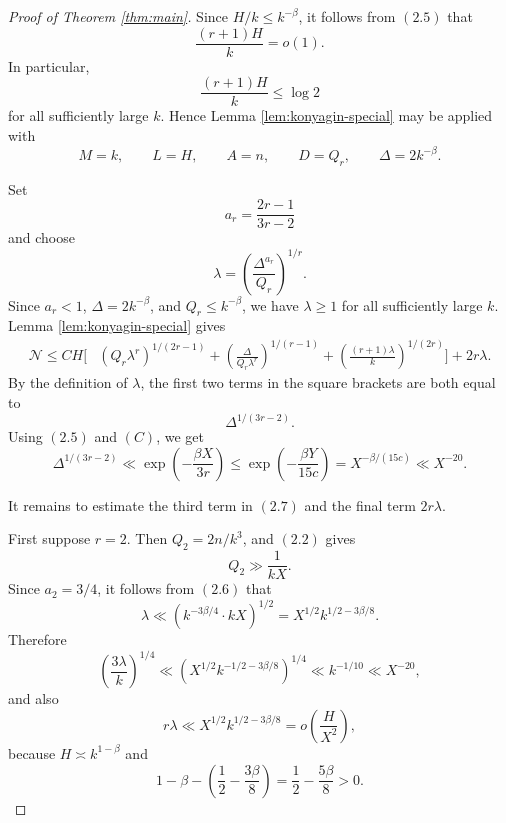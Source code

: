 \documentclass[11pt]{article}
\begin{document}
\begin{proof}[Proof of Theorem \ref{thm:main}]
Since \(H/k\le k^{-\beta}\), it follows from \((2.5)\) that
\[
        \frac{(r+1)H}{k}=o(1).
\]
In particular,
\[
        \frac{(r+1)H}{k}\le\log2
\]
for all sufficiently large \(k\). Hence Lemma \ref{lem:konyagin-special} may be
applied with
\[
        M=k,
        \qquad
        L=H,
        \qquad
        A=n,
        \qquad
        D=Q_r,
        \qquad
        \Delta=2k^{-\beta}.
\]

Set
\[
        a_r=\frac{2r-1}{3r-2}
\]
and choose
\[
        \lambda=
        \left(\frac{\Delta^{a_r}}{Q_r}\right)^{1/r} .
        \tag{2.6}
\]
Since \(a_r<1\), \(\Delta=2k^{-\beta}\), and \(Q_r\le k^{-\beta}\), we have
\(\lambda\ge1\) for all sufficiently large \(k\). Lemma
\ref{lem:konyagin-special} gives
\begin{equation}
\begin{aligned}
        \mathcal N
        \le C H\bigg[&
        (Q_r\lambda^r)^{1/(2r-1)}
        +
        \left(\frac{\Delta}{Q_r\lambda^r}\right)^{1/(r-1)}
        +
        \left(\frac{(r+1)\lambda}{k}\right)^{1/(2r)}
        \bigg]
        +2r\lambda .
\end{aligned}
\tag{2.7}
\end{equation}
By the definition of \(\lambda\), the first two terms in the square brackets are
both equal to
\[
        \Delta^{1/(3r-2)} .
\]
Using \((2.5)\) and \((C)\), we get
\[
        \Delta^{1/(3r-2)}
        \ll
        \exp\!\left(-\frac{\beta X}{3r}\right)
        \le
        \exp\!\left(-\frac{\beta Y}{15c}\right)
        =
        X^{-\beta/(15c)}
        \ll
        X^{-20}.
        \tag{2.8}
\]

It remains to estimate the third term in \((2.7)\) and the final term
\(2r\lambda\).

First suppose \(r=2\). Then \(Q_2=2n/k^3\), and \((2.2)\) gives
\[
        Q_2\gg \frac{1}{kX}.
\]
Since \(a_2=3/4\), it follows from \((2.6)\) that
\[
        \lambda
        \ll
        \left(k^{-3\beta/4}\cdot kX\right)^{1/2}
        =
        X^{1/2}k^{1/2-3\beta/8} .
        \tag{2.9}
\]
Therefore
\[
        \left(\frac{3\lambda}{k}\right)^{1/4}
        \ll
        \left(X^{1/2}k^{-1/2-3\beta/8}\right)^{1/4}
        \ll
        k^{-1/10}
        \ll
        X^{-20},
        \tag{2.10}
\]
and also
\[
        r\lambda
        \ll
        X^{1/2}k^{1/2-3\beta/8}
        =
        o\!\left(\frac{H}{X^2}\right),
        \tag{2.11}
\]
because \(H\asymp k^{1-\beta}\) and
\[
        1-\beta-
        \left(\frac12-\frac{3\beta}{8}\right)
        =
        \frac12-\frac{5\beta}{8}
        >0 .
\]


\end{proof}
\end{document}
